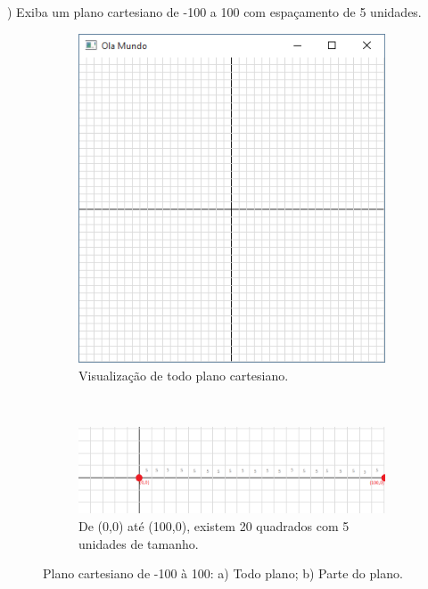 \begin{renumerate}
 \item) Exiba um plano cartesiano de -100 a 100 com espaçamento de 5 unidades.
  \label{ex:cap01_ex1}

  \begin{figure}[H]
    \centering
    \begin{subfigure}[t]{0.2\textwidth}
        \centerline{\includegraphics[width=.9\textwidth]{img/cap1_ex1.png}}
        \caption{Visualização de todo plano cartesiano.}
        \label{fig:cap01_ex1}
    \end{subfigure}
    ~
    \begin{subfigure}[t]{0.65\textwidth}
        \centerline{\includegraphics[width=.9\textwidth]{img/cap1_ex1_b.png}}
        \caption{De (0,0) até (100,0), existem 20 quadrados com 5 unidades de tamanho.}
        \label{fig:cap01_ex1}
    \end{subfigure}
    \caption{Plano cartesiano de -100 à 100: a) Todo plano; b) Parte do plano.}
\end{figure}



\end{renumerate}

